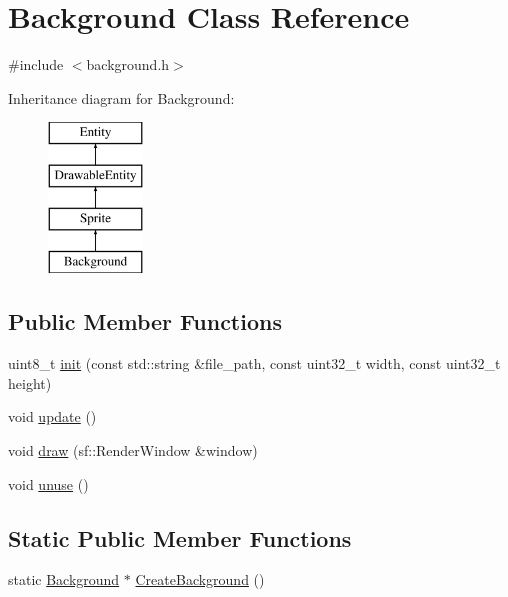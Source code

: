 \hypertarget{class_background}{}\section{Background Class Reference}
\label{class_background}


{\ttfamily \#include $<$background.\+h$>$}

Inheritance diagram for Background\+:\begin{figure}[H]
\begin{center}
\leavevmode
\includegraphics[height=4.000000cm]{class_background}
\end{center}
\end{figure}
\subsection*{Public Member Functions}
\begin{DoxyCompactItemize}
\item 
uint8\+\_\+t \hyperlink{class_background_ae4ae960cd876ef4a2f9fb6e0a7e8bc73}{init} (const std\+::string \&file\+\_\+path, const uint32\+\_\+t width, const uint32\+\_\+t height)
\item 
void \hyperlink{class_background_acab58b65d4299d4bd51b8376e8c3e3d3}{update} ()
\item 
void \hyperlink{class_background_ae3d10fe0882df48b0e1e861a7e69f37f}{draw} (sf\+::\+Render\+Window \&window)
\item 
void \hyperlink{class_background_a544eaaa5b1b55c6adebe989633521ac3}{unuse} ()
\end{DoxyCompactItemize}
\subsection*{Static Public Member Functions}
\begin{DoxyCompactItemize}
\item 
static \hyperlink{class_background}{Background} $\ast$ \hyperlink{class_background_aafc5996195781b2d4bff7d170792425d}{Create\+Background} ()
\end{DoxyCompactItemize}
